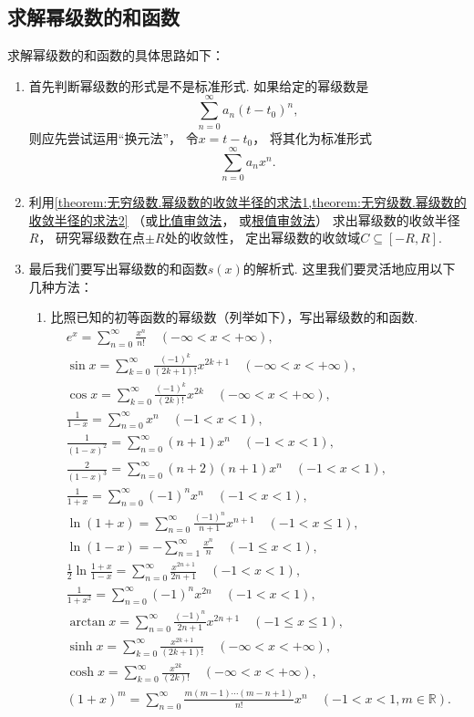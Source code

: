 \subsection*{求解幂级数的和函数}
求解幂级数的和函数的具体思路如下：
\begin{enumerate}
	\item 首先判断幂级数的形式是不是标准形式.
	如果给定的幂级数是\[
		\sum_{n=0}^\infty a_n (t-t_0)^n,
	\]
	则应先尝试运用“换元法”，
	令\(x=t-t_0\)，
	将其化为标准形式\[
		\sum_{n=0}^\infty a_n x^n.
	\]

	\item 利用\cref{theorem:无穷级数.幂级数的收敛半径的求法1,theorem:无穷级数.幂级数的收敛半径的求法2}%
	（或\hyperref[theorem:无穷级数.正项级数的比值审敛法]{比值审敛法}，
	或\hyperref[theorem:无穷级数.正项级数的根值审敛法]{根值审敛法}）%
	求出幂级数的收敛半径\(R\)，
	研究幂级数在点\(\pm R\)处的收敛性，
	定出幂级数的收敛域\(C\subseteq[-R,R]\).

	\item 最后我们要写出幂级数的和函数\(s(x)\)的解析式.
	这里我们要灵活地应用以下几种方法：\begin{enumerate}
		\item 比照已知的初等函数的幂级数（列举如下），写出幂级数的和函数.
		\begin{gather*}
			e^x = \sum_{n=0}^\infty \frac{x^n}{n!}
				\quad(-\infty<x<+\infty), \\
			\sin x = \sum_{k=0}^\infty \frac{(-1)^k}{(2k+1)!} x^{2k+1}
				\quad(-\infty<x<+\infty), \\
			\cos x = \sum_{k=0}^\infty \frac{(-1)^k}{(2k)!} x^{2k}
				\quad(-\infty<x<+\infty), \\
			\frac{1}{1-x} = \sum_{n=0}^\infty x^n
				\quad(-1<x<1), \\
			\frac{1}{(1-x)^2} = \sum_{n=0}^\infty (n+1) x^n
				\quad(-1<x<1), \\
			\frac{2}{(1-x)^3} = \sum_{n=0}^\infty (n+2)(n+1) x^n
				\quad(-1<x<1), \\
			\frac{1}{1+x} = \sum_{n=0}^\infty (-1)^n x^n
				\quad(-1<x<1), \\
			\ln(1+x) = \sum_{n=0}^\infty \frac{(-1)^n}{n+1} x^{n+1}
				\quad(-1<x\leq1), \\
			\ln(1-x) = -\sum_{n=1}^\infty \frac{x^n}{n}
				\quad(-1\leq x<1), \\
			\frac12 \ln\frac{1+x}{1-x} = \sum_{n=0}^\infty \frac{x^{2n+1}}{2n+1}
				\quad(-1<x<1), \\
			\frac{1}{1+x^2} = \sum_{n=0}^\infty (-1)^n x^{2n}
				\quad(-1<x<1), \\
			\arctan x = \sum_{n=0}^\infty \frac{(-1)^n}{2n+1} x^{2n+1}
				\quad(-1 \leq x \leq 1), \\
			\sinh x = \sum_{k=0}^\infty \frac{x^{2k+1}}{(2k+1)!}
				\quad(-\infty<x<+\infty), \\
			\cosh x = \sum_{k=0}^\infty \frac{x^{2k}}{(2k)!}
				\quad(-\infty<x<+\infty), \\
			(1+x)^m = \sum_{n=0}^\infty \frac{m(m-1)\dotsm(m-n+1)}{n!} x^n
				\quad(-1<x<1,m\in\mathbb{R}).
		\end{gather*}


\end{enumerate}
\end{enumerate}

